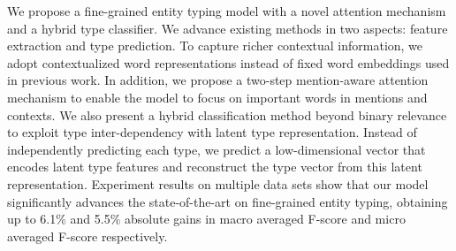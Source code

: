 We propose a fine-grained entity typing model with a novel attention mechanism and a hybrid type classifier. We advance existing methods in two aspects: feature extraction and type prediction. To capture richer contextual information, we adopt contextualized word representations instead of fixed word embeddings used in previous work. In addition, we propose a two-step mention-aware attention mechanism to enable the model to focus on important words in mentions and contexts. We also present a hybrid classification method beyond binary relevance to exploit type inter-dependency with latent type representation. Instead of independently predicting each type, we predict a low-dimensional vector that encodes latent type features and reconstruct the type vector from this latent representation. Experiment results on multiple data sets show that our model significantly advances the state-of-the-art on fine-grained entity typing, obtaining up to 6.1\% and 5.5\% absolute gains in macro averaged F-score and micro averaged F-score respectively.